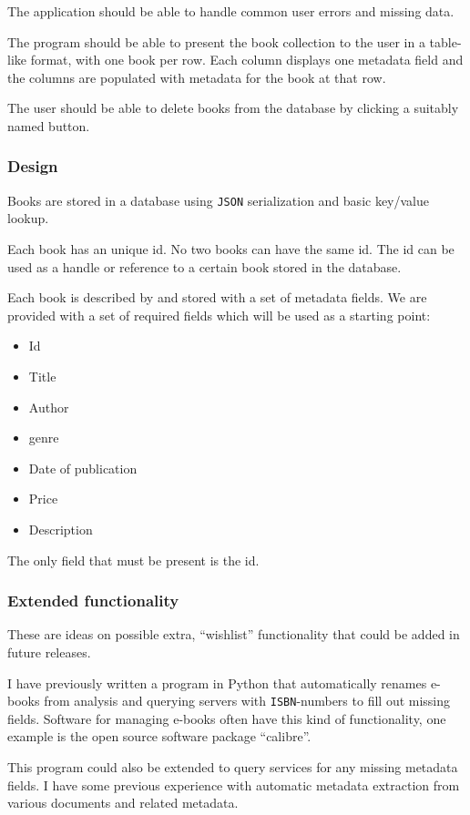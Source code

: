 The application should be able to handle common user errors and missing data.

The program should be able to present the book collection to the user in a
table-like format, with one book per row. Each column displays one metadata
field and the columns are populated with metadata for the book at that row. 

The user should be able to delete books from the database by clicking a
suitably named button.


\subsubsection{Design}
Books are stored in a database using \texttt{JSON} serialization and basic
key/value lookup.

Each book has an unique id. No two books can have the same id.  The id can be
used as a handle or reference to a certain book stored in the database.

Each book is described by and stored with a set of metadata fields.  We are
provided with a set of required fields which will be used as a starting point:

\begin{itemize}
  \item Id
  \item Title
  \item Author
  \item genre
  \item Date of publication
  \item Price
  \item Description
\end{itemize}

The only field that must be present is the id.


\subsubsection{Extended functionality}
These are ideas on possible extra, ``wishlist'' functionality that could be
added in future releases.

I have previously written a program in Python that automatically renames e-books
from analysis and querying servers with \texttt{ISBN}-numbers to fill out
missing fields. Software for managing e-books often have this kind of
functionality, one example is the open source software package
``calibre''\cite{calibre}.

This program could also be extended to query services for any missing metadata
fields. I have some previous experience with automatic metadata extraction from
various documents and related metadata.

